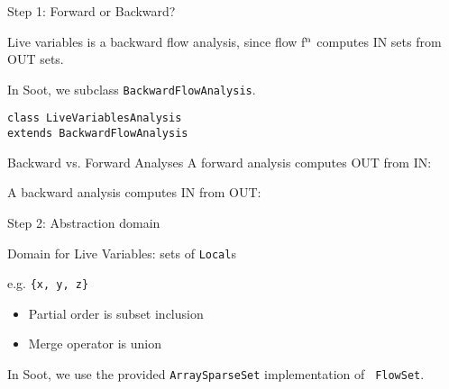 \begin{slide}{Step 1: Forward or Backward?}

Live variables is a backward flow analysis, since flow
f$^{\mbox{\scriptsize n}}$ computes {\sf IN} sets from {\sf OUT} sets.

\qquad

In Soot, we subclass {\tt \red BackwardFlowAnalysis}.

\qquad

{\red \tt class LiveVariablesAnalysis \\ \qquad extends BackwardFlowAnalysis}
\end{slide}

\begin{slide}{Backward vs. Forward Analyses}
\vspace*{-0.24in}
A forward analysis computes {\sf OUT} from {\sf IN}:

\vspace*{-0.05in}
\begin{center}

\end{center}

\vspace*{-0.05in}
A backward analysis computes {\sf IN} from {\sf OUT}:

\begin{center}

\end{center}

\end{slide}

\begin{slide}{Step 2: Abstraction domain}
\vspace*{-0.2in}

Domain for Live Variables: sets of {\tt Local}s

\qquad e.g. {\tt  \{x, y, z\}}

\begin{itemize}

\item Partial order is subset inclusion

\item Merge operator is union 

\end{itemize} 

In Soot, we use the provided {\tt ArraySparseSet} implementation of {\tt
FlowSet}.
\end{slide}

